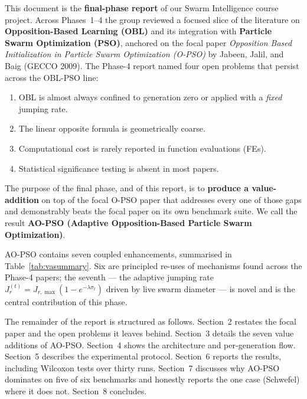 \documentclass[11pt,a4paper]{article}
\newcommand{\algoname}{AO-PSO}
\newcommand{\jrt}{J_{r}^{(t)}}
\newcommand{\jrmax}{J_{r,\max}}
\begin{document}
This document is the \textbf{final-phase report} of our Swarm Intelligence course
project. Across Phases~1--4 the group reviewed a focused slice of the
literature on \textbf{Opposition-Based Learning (OBL)} and its integration
with \textbf{Particle Swarm Optimization (PSO)}, anchored on the focal
paper \textit{Opposition Based Initialization in Particle Swarm Optimization
(O-PSO)} by Jabeen, Jalil, and Baig (GECCO 2009). The Phase-4 report named
four open problems that persist across the OBL-PSO line:
\begin{enumerate}
  \item OBL is almost always confined to generation zero or applied with a
        \emph{fixed} jumping rate.
  \item The linear opposite formula is geometrically coarse.
  \item Computational cost is rarely reported in function evaluations (FEs).
  \item Statistical significance testing is absent in most papers.
\end{enumerate}

The purpose of the final phase, and of this report, is to \textbf{produce
a value-addition} on top of the focal O-PSO paper that addresses every one
of those gaps and demonstrably beats the focal paper on its own benchmark
suite. We call the result \textbf{\algoname{} (Adaptive Opposition-Based
Particle Swarm Optimization)}.

\algoname{} contains seven coupled enhancements, summarised in
Table~\ref{tab:vasummary}. Six are principled re-uses of mechanisms found
across the Phase-4 papers; the seventh --- the adaptive jumping rate
$\jrt = \jrmax(1-e^{-\lambda\sigma_t})$ driven by live swarm diameter ---
is novel and is the central contribution of this phase.

The remainder of the report is structured as follows. Section~2 restates
the focal paper and the open problems it leaves behind. Section~3 details
the seven value additions of \algoname. Section~4 shows the architecture
and per-generation flow. Section~5 describes the experimental protocol.
Section~6 reports the results, including Wilcoxon tests over thirty runs.
Section~7 discusses why \algoname{} dominates on five of six benchmarks and
honestly reports the one case (Schwefel) where it does not. Section~8
concludes.


\end{document}
